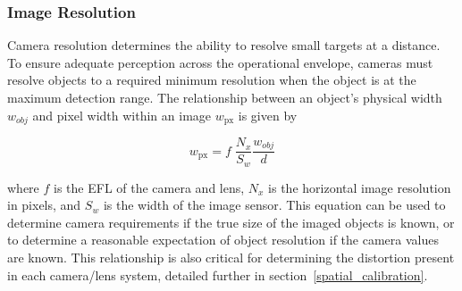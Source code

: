 \documentclass{erauthesis}
\begin{document}
\subsubsection{Image Resolution}
Camera resolution determines the ability to resolve small targets at a distance.
To ensure adequate perception across the operational envelope, cameras must resolve objects to a required minimum resolution when the object is at the maximum detection range.
The relationship between an object's physical width $\mathit{w}_{obj}$ and pixel width within an image $\mathit{w}_{\text{px}}$ is given by

\begin{equation}
\mathit{w}_{\text{px}} = f \; \frac{N_x}{S_w}\frac{\mathit{w}_{obj}}{d}
\end{equation}

where $f$ is the \ac{EFL} of the camera and lens, $N_x$ is the horizontal image resolution in pixels, and $S_w$ is the width of the image sensor.
This equation can be used to determine camera requirements if the true size of the imaged objects is known, or to determine a reasonable expectation of object resolution if the camera values are known.
This relationship is also critical for determining the distortion present in each camera/lens system, detailed further in section~\ref{spatial_calibration}.
\end{document}
